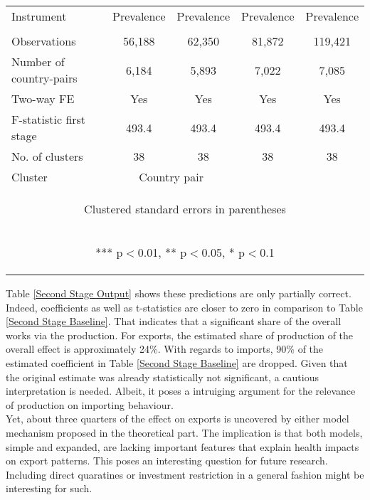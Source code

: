 \documentclass{article}
\begin{document}
\begin{table}[htbp]
{\begin{tabular}{lcccc}
Instrument & Prevalence & Prevalence & Prevalence & Prevalence \\
\vspace{4pt} & \begin{footnotesize}\end{footnotesize} & \begin{footnotesize}\end{footnotesize} & \begin{footnotesize}\end{footnotesize} & \begin{footnotesize}\end{footnotesize} \\
Observations & 56,188 & 62,350 & 81,872 & 119,421 \\
Number of country-pairs & 6,184 & 5,893 & 7,022 & 7,085 \\
Two-way FE & Yes & Yes & Yes & Yes \\
F-statistic first stage & 493.4 & 493.4 & 493.4 & 493.4 \\
No. of clusters & 38 & 38 & 38 & 38 \\ 
Cluster & \multicolumn{2}{c}{Country pair} \\ \hline
\multicolumn{5}{c}{\begin{footnotesize} Clustered standard errors in parentheses\end{footnotesize}} \\
\multicolumn{5}{c}{\begin{footnotesize} *** p$<$0.01, ** p$<$0.05, * p$<$0.1\end{footnotesize}} \\
\end{tabular}
}
\end{table}
Table \ref{Second Stage Output} shows these predictions are only partially correct. Indeed, coefficients as well as t-statistics are closer to zero in comparison to Table \ref{Second Stage Baseline}. That indicates that a significant share of the overall works via the production. For exports, the estimated share of production of the overall effect is approximately 24\%. With regards to imports, 90\% of the estimated coefficient in Table \ref{Second Stage Baseline} are dropped. Given that the original estimate was already statistically not significant, a cautious interpretation is needed. Albeit, it poses a intruiging argument for the relevance of production on importing behaviour. \\
Yet, about three quarters of the effect on exports is uncovered by either model mechanism proposed in the theoretical part. The implication is that both models, simple and expanded, are lacking important features that explain health impacts on export patterns. This poses an interesting question for future research. Including direct quaratines or investment restriction in a general fashion might be interesting for such. \\
\end{document}
